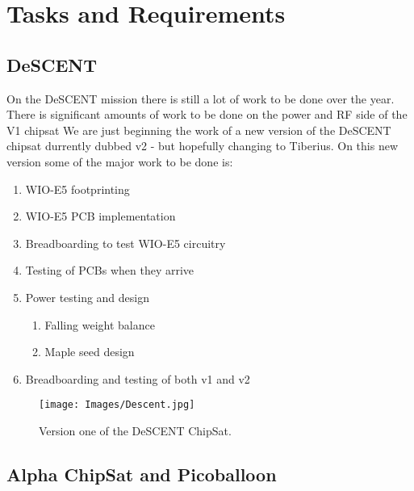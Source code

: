 \section{Tasks and Requirements}
\subsection{DeSCENT}

On the DeSCENT mission there is still a lot of work to be done over the year. There is significant amounts of work to be done on the power and RF side of the V1 chipsat We are just beginning the work of a new version of the DeSCENT chipsat 
durrently dubbed v2 - but hopefully changing to Tiberius.
On this new version some of the major work to be done is:
\begin{enumerate}
    \item WIO-E5 footprinting
    \item WIO-E5 PCB implementation
    \item Breadboarding to test WIO-E5 circuitry
    \item Testing of PCBs when they arrive
    \item Power testing and design \begin{enumerate}
        \item Falling weight balance
        \item Maple seed design
            \end{enumerate}
    \item Breadboarding and testing of both v1 and v2
\end{enumerate}
\begin{figure}[H]
    \begin{center}
            \texttt{[image: Images/Descent.jpg]}\caption{Version one of the DeSCENT ChipSat.}
    \end{center}
\end{figure}

\subsection{Alpha ChipSat and Picoballoon}

